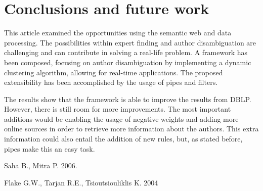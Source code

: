 \documentclass[9pt, twocolumn]{phdsymp} %
\begin{document}
\section{Conclusions and future work}

This article examined the opportunities using the semantic web and data processing. The possibilities within expert finding and author disambiguation are challenging and can contribute in solving a real-life problem. A framework has been composed, focusing on author disambiguation by implementing a dynamic clustering algorithm, allowing for real-time applications. The proposed extensibility has been accomplished by the usage of pipes and filters.

The results show that the framework is able to improve the results from DBLP. However, there is still room for more improvements. The most important additions would be enabling the usage of negative weights and adding more online sources in order to retrieve more information about the authors. This extra information could also entail the addition of new rules, but, as stated before, pipes make this an easy task.





%
\begin{thebibliography}{1}
%
Saha B., Mitra P.  2006. 

Flake G.W., Tarjan R.E., Tsioutsiouliklis K.  2004

%
%
\end{thebibliography}
%
\end{document}
